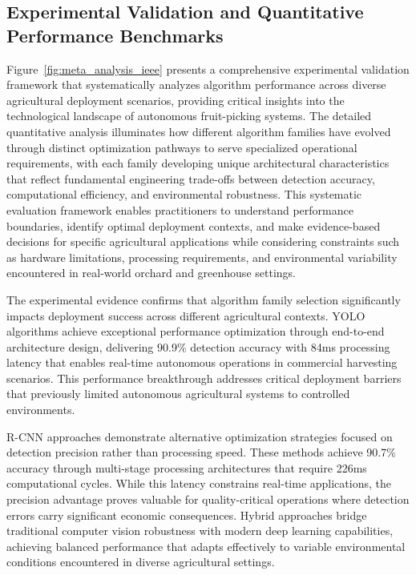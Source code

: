 \documentclass{ieeeaccess}
\begin{document}
\subsection{Experimental Validation and Quantitative Performance Benchmarks}
Figure~\ref{fig:meta_analysis_ieee} presents a comprehensive experimental validation framework that systematically analyzes algorithm performance across diverse agricultural deployment scenarios, providing critical insights into the technological landscape of autonomous fruit-picking systems. The detailed quantitative analysis illuminates how different algorithm families have evolved through distinct optimization pathways to serve specialized operational requirements, with each family developing unique architectural characteristics that reflect fundamental engineering trade-offs between detection accuracy, computational efficiency, and environmental robustness. This systematic evaluation framework enables practitioners to understand performance boundaries, identify optimal deployment contexts, and make evidence-based decisions for specific agricultural applications while considering constraints such as hardware limitations, processing requirements, and environmental variability encountered in real-world orchard and greenhouse settings.

The experimental evidence confirms that algorithm family selection significantly impacts deployment success across different agricultural contexts. YOLO algorithms achieve exceptional performance optimization through end-to-end architecture design, delivering 90.9\% detection accuracy with 84ms processing latency that enables real-time autonomous operations in commercial harvesting scenarios. This performance breakthrough addresses critical deployment barriers that previously limited autonomous agricultural systems to controlled environments.

R-CNN approaches demonstrate alternative optimization strategies focused on detection precision rather than processing speed. These methods achieve 90.7\% accuracy through multi-stage processing architectures that require 226ms computational cycles. While this latency constrains real-time applications, the precision advantage proves valuable for quality-critical operations where detection errors carry significant economic consequences. Hybrid approaches bridge traditional computer vision robustness with modern deep learning capabilities, achieving balanced performance that adapts effectively to variable environmental conditions encountered in diverse agricultural settings.
\end{document}
